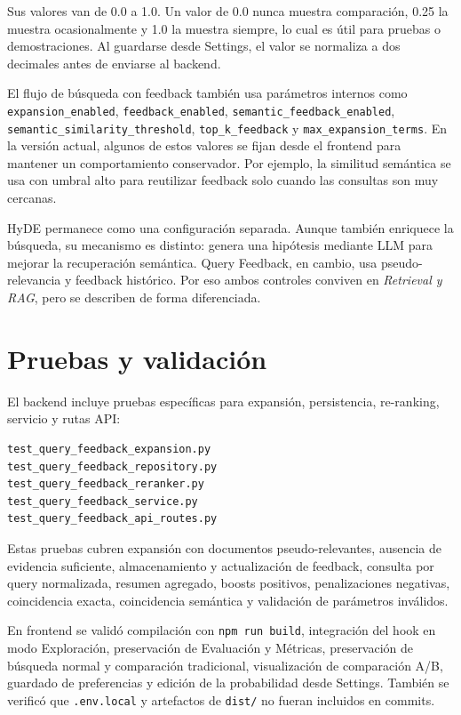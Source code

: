\documentclass[12pt,a4paper]{article}
\begin{document}
Sus valores van de 0.0 a 1.0. Un valor de 0.0 nunca muestra comparación, 0.25 la muestra ocasionalmente y 1.0 la muestra siempre, lo cual es útil para pruebas o demostraciones. Al guardarse desde Settings, el valor se normaliza a dos decimales antes de enviarse al backend.

El flujo de búsqueda con feedback también usa parámetros internos como \texttt{expansion\_enabled}, \texttt{feedback\_enabled}, \texttt{semantic\_feedback\_enabled}, \texttt{semantic\_similarity\_threshold}, \texttt{top\_k\_feedback} y \texttt{max\_expansion\_terms}. En la versión actual, algunos de estos valores se fijan desde el frontend para mantener un comportamiento conservador. Por ejemplo, la similitud semántica se usa con umbral alto para reutilizar feedback solo cuando las consultas son muy cercanas.

HyDE permanece como una configuración separada. Aunque también enriquece la búsqueda, su mecanismo es distinto: genera una hipótesis mediante LLM para mejorar la recuperación semántica. Query Feedback, en cambio, usa pseudo-relevancia y feedback histórico. Por eso ambos controles conviven en \textit{Retrieval y RAG}, pero se describen de forma diferenciada.

\section{Pruebas y validación}

El backend incluye pruebas específicas para expansión, persistencia, re-ranking, servicio y rutas API:

\begin{lstlisting}
test_query_feedback_expansion.py
test_query_feedback_repository.py
test_query_feedback_reranker.py
test_query_feedback_service.py
test_query_feedback_api_routes.py
\end{lstlisting}

Estas pruebas cubren expansión con documentos pseudo-relevantes, ausencia de evidencia suficiente, almacenamiento y actualización de feedback, consulta por query normalizada, resumen agregado, boosts positivos, penalizaciones negativas, coincidencia exacta, coincidencia semántica y validación de parámetros inválidos.

En frontend se validó compilación con \texttt{npm run build}, integración del hook en modo Exploración, preservación de Evaluación y Métricas, preservación de búsqueda normal y comparación tradicional, visualización de comparación A/B, guardado de preferencias y edición de la probabilidad desde Settings. También se verificó que \texttt{.env.local} y artefactos de \texttt{dist/} no fueran incluidos en commits.
\end{document}
